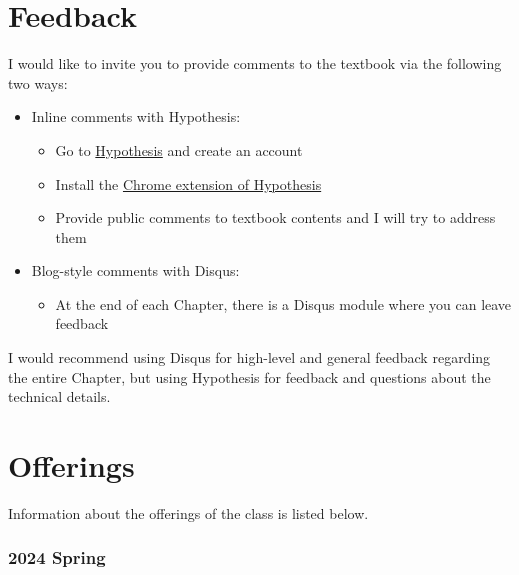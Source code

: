 \documentclass[
]{book}
\providecommand{\tightlist}{%
  \setlength{\itemsep}{0pt}\setlength{\parskip}{0pt}}
\theoremstyle{definition}
\theoremstyle{definition}
\theoremstyle{definition}
\theoremstyle{definition}
\theoremstyle{remark}
\begin{document}
\hypertarget{feedback}{%
\section*{Feedback}\label{feedback}}

I would like to invite you to provide comments to the textbook via the following two ways:

\begin{itemize}
\tightlist
\item
  Inline comments with Hypothesis:

  \begin{itemize}
  \tightlist
  \item
    Go to \href{https://hypothes.is}{Hypothesis} and create an account
  \item
    Install the \href{https://chrome.google.com/webstore/detail/hypothesis-web-pdf-annota/bjfhmglciegochdpefhhlphglcehbmek}{Chrome extension of Hypothesis}
  \item
    Provide public comments to textbook contents and I will try to address them
  \end{itemize}
\item
  Blog-style comments with Disqus:

  \begin{itemize}
  \tightlist
  \item
    At the end of each Chapter, there is a Disqus module where you can leave feedback
  \end{itemize}
\end{itemize}

I would recommend using Disqus for high-level and general feedback regarding the entire Chapter, but using Hypothesis for feedback and questions about the technical details.

\hypertarget{offerings}{%
\section*{Offerings}\label{offerings}}

Information about the offerings of the class is listed below.

\hypertarget{spring}{%
\subsubsection*{2024 Spring}\label{spring}}
\end{document}
